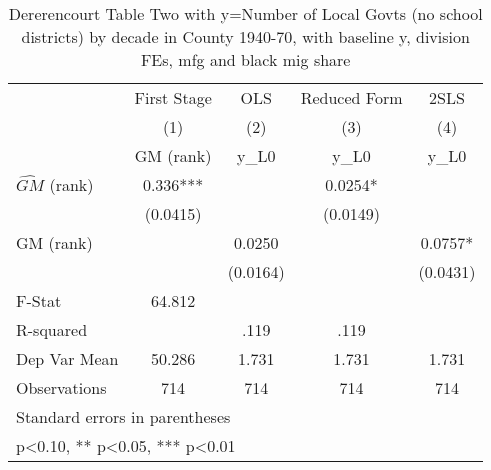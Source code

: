 \begin{table}[htbp]\centering
\def\sym#1{\ifmmode^{#1}\else\(^{#1}\)\fi}
\caption{Dererencourt Table Two with y=Number of Local Govts (no school districts) by decade in County 1940-70, with baseline y, division FEs, mfg and black mig share}
\begin{tabular}{l*{4}{c}}
\toprule
                    & First Stage   &         OLS   &Reduced Form   &        2SLS   \\
                    &\multicolumn{1}{c}{(1)}&\multicolumn{1}{c}{(2)}&\multicolumn{1}{c}{(3)}&\multicolumn{1}{c}{(4)}\\
                    &\multicolumn{1}{c}{GM  (rank)}&\multicolumn{1}{c}{y\_L0}&\multicolumn{1}{c}{y\_L0}&\multicolumn{1}{c}{y\_L0}\\
\midrule
$\hat{GM}$ (rank)   &       0.336***&               &      0.0254*  &               \\
                    &    (0.0415)   &               &    (0.0149)   &               \\
\addlinespace
GM  (rank)          &               &      0.0250   &               &      0.0757*  \\
                    &               &    (0.0164)   &               &    (0.0431)   \\
\midrule
F-Stat              &      64.812   &               &               &               \\
R-squared           &               &        .119   &        .119   &               \\
Dep Var Mean        &      50.286   &       1.731   &       1.731   &       1.731   \\
Observations        &         714   &         714   &         714   &         714   \\
\bottomrule
\multicolumn{5}{l}{\footnotesize Standard errors in parentheses}\\
\multicolumn{5}{l}{\footnotesize * p<0.10, ** p<0.05, *** p<0.01}\\
\end{tabular}
\end{table}
